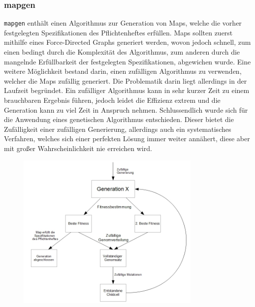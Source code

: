 \subsubsection{mapgen}
\verb+mapgen+ enthält einen Algorithmus zur Generation von Maps, welche die vorher festgelegten Spezifikationen des Pflichtenheftes erfüllen. Maps sollten zuerst mithilfe eines Force-Directed Graphs generiert werden, wovon jedoch schnell, zum einen bedingt durch die Komplexität des Algorithmus, zum anderen durch die mangelnde Erfüllbarkeit der festgelegten Spezifikationen, abgewichen wurde. Eine weitere Möglichkeit bestand darin, einen zufälligen Algorithmus zu verwenden, welcher die Maps zufällig generiert. Die Problematik darin liegt allerdings in der Laufzeit begründet. Ein zufälliger Algorithmus kann in sehr kurzer Zeit zu einem brauchbaren Ergebnis führen, jedoch leidet die Effizienz extrem und die Generation kann zu viel Zeit in Anspruch nehmen. Schlussendlich wurde sich für die Anwendung eines genetischen Algorithmus entschieden. Dieser bietet die Zufälligkeit einer zufälligen Generierung, allerdings auch ein systematisches Verfahren, welches sich einer perfekten Lösung immer weiter annähert, diese aber mit großer Wahrscheinlichkeit nie erreichen wird. 
\begin{figure}[H]
	\centering
	\includegraphics[width=0.8\textwidth]{Gen_Alg.png}
\end{figure}
